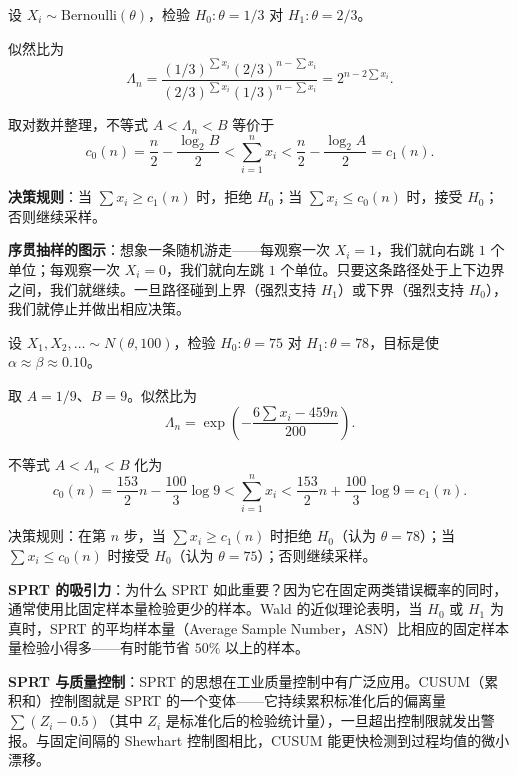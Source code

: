 \begin{example}\label{ex:bernoulli-sprt}
设 $X_i \sim \mathrm{Bernoulli}(\theta)$，检验 $H_0: \theta = 1/3$ 对 $H_1: \theta = 2/3$。

似然比为
\[
\Lambda_n = \frac{(1/3)^{\sum x_i} (2/3)^{n-\sum x_i}}{(2/3)^{\sum x_i} (1/3)^{n-\sum x_i}} = 2^{n - 2\sum x_i}.
\]

取对数并整理，不等式 $A < \Lambda_n < B$ 等价于
\[
c_0(n) = \frac{n}{2} - \frac{\log_2 B}{2} < \sum_{i=1}^n x_i < \frac{n}{2} - \frac{\log_2 A}{2} = c_1(n).
\]

\textbf{决策规则}：当 $\sum x_i \geq c_1(n)$ 时，拒绝 $H_0$；当 $\sum x_i \leq c_0(n)$ 时，接受 $H_0$；否则继续采样。

\textbf{序贯抽样的图示}：想象一条随机游走——每观察一次 $X_i = 1$，我们就向右跳 $1$ 个单位；每观察一次 $X_i = 0$，我们就向左跳 $1$ 个单位。只要这条路径处于上下边界之间，我们就继续。一旦路径碰到上界（强烈支持 $H_1$）或下界（强烈支持 $H_0$），我们就停止并做出相应决策。\end{example}

\begin{example}\label{ex:normal-sprt}
设 $X_1, X_2, \ldots \sim N(\theta, 100)$，检验 $H_0: \theta = 75$ 对 $H_1: \theta = 78$，目标是使 $\alpha \approx \beta \approx 0.10$。

取 $A = 1/9$、$B = 9$。似然比为
\[
\Lambda_n = \exp\left(-\frac{6\sum x_i - 459n}{200}\right).
\]

不等式 $A < \Lambda_n < B$ 化为
\[
c_0(n) = \frac{153}{2}n - \frac{100}{3}\log 9 < \sum_{i=1}^n x_i < \frac{153}{2}n + \frac{100}{3}\log 9 = c_1(n).
\]

决策规则：在第 $n$ 步，当 $\sum x_i \geq c_1(n)$ 时拒绝 $H_0$（认为 $\theta = 78$）；当 $\sum x_i \leq c_0(n)$ 时接受 $H_0$（认为 $\theta = 75$）；否则继续采样。\end{example}

\textbf{SPRT 的吸引力}：为什么 SPRT 如此重要？因为它在固定两类错误概率的同时，通常使用比固定样本量检验更少的样本。Wald 的近似理论表明，当 $H_0$ 或 $H_1$ 为真时，SPRT 的平均样本量（Average Sample Number，ASN）比相应的固定样本量检验小得多——有时能节省 $50\%$ 以上的样本。

\textbf{SPRT 与质量控制}：SPRT 的思想在工业质量控制中有广泛应用。CUSUM（累积和）控制图就是 SPRT 的一个变体——它持续累积标准化后的偏离量 $\sum (Z_i - 0.5)$（其中 $Z_i$ 是标准化后的检验统计量），一旦超出控制限就发出警报。与固定间隔的 Shewhart 控制图相比，CUSUM 能更快检测到过程均值的微小漂移。

